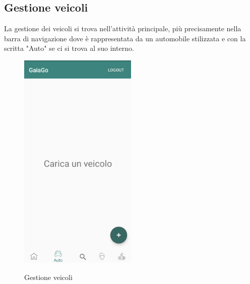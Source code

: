 \subsection{Gestione veicoli}
\label{veicolo}
La gestione dei veicoli si trova nell'attività principale, più precisamente nella barra di navigazione dove è rappresentata da un automobile stilizzata e con la scritta "Auto" se ci si trova al suo interno.
 \begin{figure}[H] 
	\centering 
	\includegraphics[width=0.5\textwidth]{res/images/gestione_veicolo.png}\\
	\caption{Gestione veicoli}
	\label{main}
\end{figure}
\pagebreak
